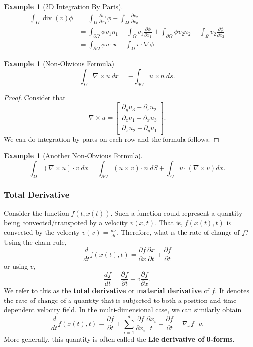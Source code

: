 \documentclass{article}
\theoremstyle{definition}
\newtheorem{example}[theorem]{Example}
\theoremstyle{definition}
\begin{document}
\begin{example}[2D Integration By Parts]
    \begin{align*}
        \int_{\Omega}\operatorname{div}(v)\phi&=\int_{\Omega}\frac{\partial v_1}{\partial x_1}\phi+\int_{\Omega}\frac{\partial v_2}{\partial v_2}\\
            &=\int_{\partial\Omega}\phi v_1n_1-\int_{\Omega}v_1\frac{\partial \phi}{\partial x_1}+\int_{\partial\Omega}\phi v_2n_2-\int_{\Omega}v_2\frac{\partial \phi}{\partial x_2} \\
            &=\int_{\partial\Omega}\phi v\cdot n-\int_{\Omega}v\cdot \nabla\phi.
    \end{align*}
\end{example}
\begin{example}[Non-Obvious Formula]
    $$\int_{\Omega}\nabla \times u\:dx=-\int_{\partial \Omega}u\times n\:ds.$$
    \begin{proof}
        Consider that
        $$\nabla \times u=\begin{bmatrix}
            \partial_{y}u_3-\partial_{z}u_2 \\
            \partial_{z}u_1-\partial_{x}u_3 \\
            \partial_{x}u_2-\partial_{y}u_1
        \end{bmatrix}.$$
        We can do integration by parts on each row and the formula follows.
    \end{proof}
\end{example}
\begin{example}[Another Non-Obvious Formula]
    $$\int_{\Omega}(\nabla \times u)\cdot v\:dx=\int_{\partial \Omega}(u\times v)\cdot n\:dS+\int_{\Omega}u\cdot(\nabla \times v)dx.$$
\end{example}
\subsubsection{Total Derivative}
Consider the function $f(t,x(t))$. Such a function could represent a quantity being convected/transpoted by a velocity $v(x,t)$. That is, $f(x(t),t)$ is convected by the velocity $v(x)=\frac{dx}{dt}$. Therefore, what is the rate of change of $f$? Using the chain rule,
$$\frac{d}{dt}f(x(t),t)=\frac{\partial f}{\partial x}\frac{\partial x}{\partial t}+\frac{\partial f}{\partial t}$$
or using $v$,
$$\frac{df}{dt}=\frac{\partial f}{\partial t}+v\frac{\partial f}{\partial x}.$$
We refer to this as the \textbf{total derivative} or \textbf{material derivative} of $f$. It denotes the rate of change of a quantity that is subjected to both a position and time dependent velocity field. In the multi-dimensional case, we can similarly obtain
$$\frac{d}{dt}f(x(t),t)=\frac{\partial f}{\partial t}+\sum_{i=1}^{d}\frac{\partial f}{\partial x_i}\frac{\partial x_i}{t}=\frac{\partial f}{\partial t}+\nabla_x f\cdot v.$$
More generally, this quantity is often called the \textbf{Lie derivative of 0-forms}.
\end{document}
